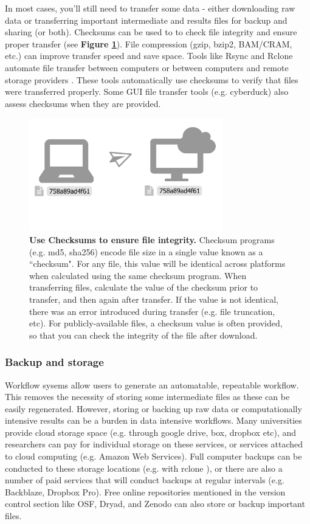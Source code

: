 \documentclass[10pt,letterpaper]{article}
\begin{document}
In most cases, you'll still need to transfer some data - either downloading raw data or transferring important intermediate and results files for backup and sharing (or both). 
Checksums can be used to to check file integrity and ensure proper transfer (see \textbf{Figure \ref{fig:checksum}}).
File compression (gzip, bzip2, BAM/CRAM, etc.) can improve transfer speed and save space.
Tools like Rsync and Rclone automate file transfer between computers or between computers and remote storage providers \cite{bailleul2016rclone}. 
These tools automatically use checksums to verify that files were transferred properly.
Some GUI file transfer tools (e.g. cyberduck) also assess checksums when they are provided.

\begin{figure}
\centering
\includegraphics[width=0.75\textwidth]{figures/checksum.pdf}
\caption{\textbf{Use Checksums to ensure file integrity.} Checksum programs (e.g. md5, sha256) encode file size in a single value known as a ``checksum".
For any file, this value will be identical across platforms when calculated using the same checksum program. %
When transferring files, calculate the value of the checksum prior to transfer, and then again after transfer.
If the value is not identical, there was an error introduced during transfer (e.g. file truncation, etc).
For publicly-available files, a checksum value is often provided, so that you can check the integrity of the file after download.
 } 
\label{fig:checksum}
\end{figure}

\subsubsection*{Backup and storage} 

Workflow sysems allow users to generate an automatable, repeatable workflow.
This removes the necessity of storing some intermediate files as these can be easily regenerated.
However, storing or backing up raw data or computationally intensive results can be a burden in data intensive workflows.
Many universities provide cloud storage space (e.g. through google drive, box, dropbox etc), and researchers can pay for individual storage on these services, or services attached to cloud computing (e.g. Amazon Web Services). 
Full computer backups can be conducted to these storage locations (e.g. with rclone \cite{bailleul2016rclone}), or there are also a number of paid services that will conduct backups at regular intervals (e.g. Backblaze, Dropbox Pro). 
Free online repositories mentioned in the version control section like OSF, Dryad, and Zenodo can also store or backup important files. 
\end{document}
